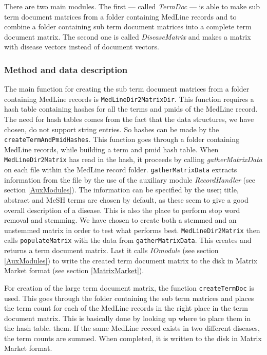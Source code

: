 There are two main modules. The first --- called \textit{TermDoc} --- is
able to make sub term document matrices from a folder containing
MedLine records and to combine a folder containing sub term document
matrices into a complete term document matrix. The second one is
called \textit{DiseaseMatrix} and makes a matrix with disease vectors
instead of document vectors.

\subsubsection{Method and data description}
The main function for creating the sub term document matrices from a
folder containing MedLine records is
\texttt{MedLineDir2MatrixDir}. This function requires a hash table
containing hashes for all the terms and pmids of the MedLine
record. The need for hash tables comes from the fact that the data
structures, we have chosen, do not support string entries. So hashes
can be made by the \texttt{createTermAndPmidHashes}. This function
goes through a folder containing MedLine records, while building a
term and pmid hash table. When \texttt{MedLineDir2Matrix} has read in
the hash, it proceeds by calling \textit{gatherMatrixData} on each
file within the MedLine record folder. \texttt{gatherMatrixData}
extracts information from the file by the use of the auxiliary module
\textit{RecordHandler} (see section \ref{AuxModules}). The information
can be specified by the user; title, abstract and MeSH terms are
chosen by default, as these seem to give a good overall description of
a disease. This is also the place to perform stop word removal and
stemming. We have chosen to create both a stemmed and an unstemmed
matrix in order to test what performs best. \texttt{MedLineDir2Matrix} then
calls \texttt{populateMatrix} with the data from
\texttt{gatherMatrixData}. This creates and returns a term document
matrix. Last it calls \textit{IOmodule} (see section \ref{AuxModules}) to write
the created term document matrix to the disk in Matrix Market format
(see section \ref{MatrixMarket}).

For creation of the large term document matrix, the function
\texttt{createTermDoc} is used. This goes through the folder
containing the sub term matrices and places the term count for each of
the MedLine records in the right place in the term document
matrix. This is basically done by looking up where to place them in
the hash table.  them. If the same MedLine record exists in two
different diseases, the term counts are summed. When completed, it is
written to the disk in Matrix Market format.

